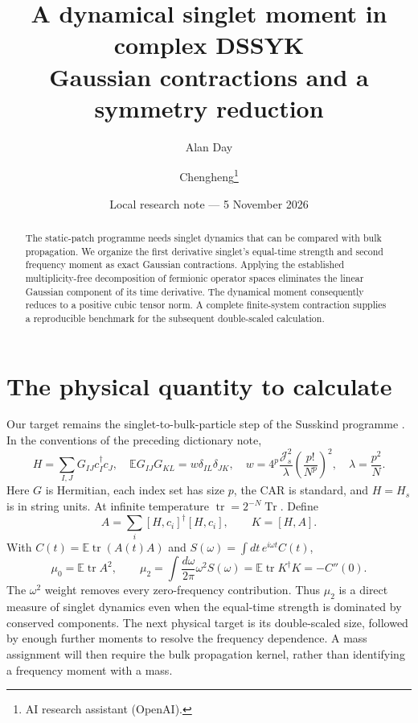 \documentclass[11pt,a4paper]{article}
\title{A dynamical singlet moment in complex DSSYK\\Gaussian contractions and a symmetry reduction}
\author{Alan Day \and Chengheng\thanks{AI research assistant (OpenAI).}}
\date{Local research note --- 5 November 2026}
\newcommand{\tr}{\operatorname{tr}}
\newcommand{\Tr}{\operatorname{Tr}}
\newcommand{\E}{\mathbb E}
\begin{document}
\maketitle
\begin{abstract}
The static-patch programme needs singlet dynamics that can be compared with
bulk propagation. We organize the first derivative singlet's equal-time
strength and second frequency moment as exact Gaussian contractions.
Applying the established multiplicity-free decomposition of fermionic
operator spaces eliminates the linear Gaussian component of its time
derivative. The dynamical moment consequently reduces to a positive cubic
tensor norm. A complete finite-system contraction supplies a reproducible
benchmark for the subsequent double-scaled calculation.
\end{abstract}

\section{The physical quantity to calculate}
Our target remains the singlet-to-bulk-particle step of the Susskind
programme \cite{mss}. In the conventions of the preceding dictionary note,
\begin{equation}
 H=\sum_{I,J}G_{IJ}c_I^\dagger c_J,\quad
 \E G_{IJ}G_{KL}=w\delta_{IL}\delta_{JK},\quad
 w=4^p\frac{\mathcal J_s^2}{\lambda}
             \left(\frac{p!}{N^p}\right)^2,\quad \lambda=\frac{p^2}{N}.
\end{equation}
Here $G$ is Hermitian, each index set has size $p$, the CAR is standard,
and $H=H_s$ is in string units. At infinite temperature
$\tr=2^{-N}\Tr$. Define
\begin{equation}
 A=\sum_i[H,c_i]^\dagger[H,c_i],\qquad K=[H,A].
\end{equation}
With $C(t)=\E\tr(A(t)A)$ and $S(\omega)=\int dt\,e^{i\omega t}C(t)$,
\begin{equation}
 \mu_0=\E\tr A^2,\qquad
 \boxed{\mu_2=\int\frac{d\omega}{2\pi}\omega^2S(\omega)
             =\E\tr K^\dagger K=-C''(0).}\label{moment}
\end{equation}
The $\omega^2$ weight removes every zero-frequency contribution. Thus
$\mu_2$ is a direct measure of singlet dynamics even when the equal-time
strength is dominated by conserved components. The next physical target is
its double-scaled size, followed by enough further moments to resolve the
frequency dependence. A mass assignment will then require the bulk
propagation kernel, rather than identifying a frequency moment with a mass.
\end{document}
